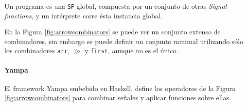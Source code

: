   Un programa es una \texttt{SF} global, compuesta por un conjunto
de otras \textit{Signal functions}, y un intérprete corre ésta instancia
global.

  En la Figura \ref{fig:arrowcombinators} se puede ver un conjunto
extenso de combinadores, sin embargo se
puede definir un conjunto minimal utilizando sólo
los combinadores \texttt{arr},
$\gg$ y \texttt{first}, aunque no es el único.

  \paragraph{Yampa}
  El framework Yampa \cite{yampa} embebido en Haskell, 
  define los operadores de la Figura \ref{fig:arrowcombinators}
  para combinar señales y aplicar funciones sobre ellas.


